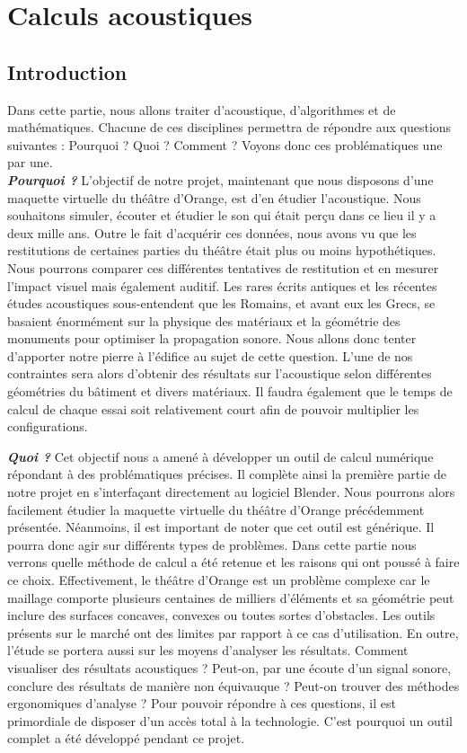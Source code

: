 \part{Calculs acoustiques}
	\chapter*{Introduction}
Dans cette partie, nous allons traiter d'acoustique, d'algorithmes et de mathématiques. Chacune de ces disciplines permettra de répondre aux questions suivantes : Pourquoi ? Quoi ? Comment ? Voyons donc ces problématiques une par une.\\

\textit{\textbf{Pourquoi ?}} L'objectif de notre projet, maintenant que nous disposons d'une maquette virtuelle du théâtre d'Orange, est d'en étudier l'acoustique. Nous souhaitons  simuler, écouter et étudier le son qui était perçu dans ce lieu il y a deux mille ans. Outre le fait d'acquérir ces données, nous avons vu que les restitutions de certaines parties du théâtre était plus ou moins hypothétiques. Nous pourrons comparer ces différentes tentatives de restitution et en mesurer l'impact visuel mais également auditif. Les rares écrits antiques et les récentes études acoustiques sous-entendent que les Romains, et avant eux les Grecs, se basaient énormément sur la physique des matériaux et la géométrie des monuments pour optimiser la propagation sonore. Nous allons donc tenter d'apporter notre pierre à l'édifice au sujet de cette question. L'une de nos contraintes sera alors d'obtenir des résultats sur l'acoustique selon différentes géométries du bâtiment et divers matériaux. Il faudra également que le temps de calcul de chaque essai soit relativement court afin de pouvoir multiplier les configurations.

\textit{\textbf{Quoi ?}} Cet objectif nous a amené à développer un outil de calcul numérique répondant à des problématiques précises. Il complète ainsi la première partie de notre projet en s'interfaçant directement au logiciel Blender. Nous pourrons alors facilement étudier la maquette virtuelle du théâtre d'Orange précédemment présentée. Néanmoins, il est important de noter que cet outil est générique. Il pourra donc agir sur différents types de problèmes. Dans cette partie nous verrons quelle méthode de calcul a été retenue et les raisons qui ont poussé à faire ce choix. Effectivement, le théâtre d'Orange est un problème complexe car le maillage comporte plusieurs centaines de milliers d'éléments et sa géométrie peut inclure des surfaces concaves, convexes ou toutes sortes d'obstacles. Les outils présents sur le marché ont des limites par rapport à ce cas d'utilisation. En outre, l'étude se portera aussi sur les moyens d'analyser les résultats. Comment visualiser des résultats acoustiques ? Peut-on, par une écoute d'un signal sonore, conclure des résultats de manière non équivauque ? Peut-on trouver des méthodes ergonomiques d'analyse ? Pour pouvoir répondre à ces questions, il est primordiale de disposer d'un accès total à la technologie. C'est pourquoi un outil complet a été développé pendant ce projet.

